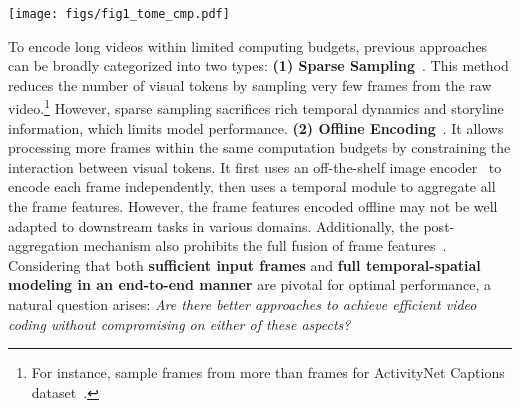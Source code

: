 \documentclass[11pt]{article}
\newcommand{\modelname}{TESTA\xspace}
\begin{document}
\begin{figure*}[t]
\centering
\texttt{[image: figs/fig1\_tome\_cmp.pdf]}
\caption{Two blocks on the left compare ToMe~\citep{Bolya2022TokenMY} and our \modelname on three aspects: video token definition, aggregation method, and computation complexity. The block on the right illustrates \modelname's divided temporal aggregation (left) and spatial aggregation (right). Patches sharing the same inner and border colors are merged together. Our aggregation gradually reduces the number of frames and patches by averaging their features during the forward process of video encoding.} \label{fig:overview}
\end{figure*}


To encode long videos within limited computing budgets, previous approaches can be broadly categorized into two types: 
\textbf{(1) Sparse Sampling}~\citep{Lei2021LessIM, Sun2022LongFormVP, Lei2022RevealingSF}. This method reduces the number of visual tokens by sampling very few frames from the raw video.\footnote{For instance, sample  frames from more than  frames for ActivityNet Captions dataset~\citep{Krishna2017DenseCaptioningEI}.} 
However, sparse sampling sacrifices rich temporal dynamics and storyline information, which limits model performance. 
\textbf{(2) Offline Encoding}~\citep{Luo2021CLIP4ClipAE, Bain2022ACG}. It allows processing more frames within the same computation budgets by constraining the interaction between visual tokens. It first uses an off-the-shelf image encoder~\citep{Dosovitskiy2020AnII, Radford2021LearningTV} to encode each frame independently, then uses a temporal module to aggregate all the frame features. However, the frame features encoded offline may not be well adapted to downstream tasks in various domains. 
Additionally, the post-aggregation mechanism also prohibits the full fusion of frame features~\citep{Cheng2022VindLUAR}. 
Considering that both \textbf{sufficient input frames} and \textbf{full temporal-spatial modeling in an end-to-end manner} are pivotal for optimal performance, a natural question arises: \textit{Are there better approaches to achieve efficient video coding without compromising on either of these aspects?}
\end{document}
